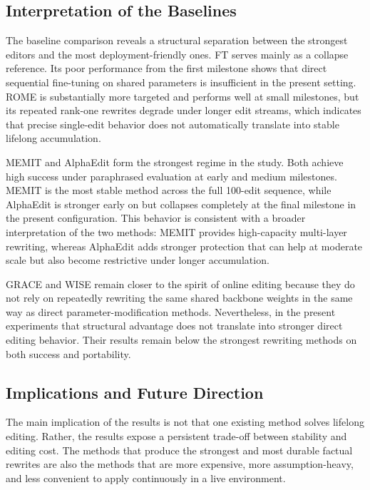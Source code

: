 \subsection{Interpretation of the Baselines}

The baseline comparison reveals a structural separation between the strongest editors and the most deployment-friendly ones. FT serves mainly as a collapse reference. Its poor performance from the first milestone shows that direct sequential fine-tuning on shared parameters is insufficient in the present setting. ROME is substantially more targeted and performs well at small milestones, but its repeated rank-one rewrites degrade under longer edit streams, which indicates that precise single-edit behavior does not automatically translate into stable lifelong accumulation.

MEMIT and AlphaEdit form the strongest regime in the study. Both achieve high success under paraphrased evaluation at early and medium milestones. MEMIT is the most stable method across the full 100-edit sequence, while AlphaEdit is stronger early on but collapses completely at the final milestone in the present configuration. This behavior is consistent with a broader interpretation of the two methods: MEMIT provides high-capacity multi-layer rewriting, whereas AlphaEdit adds stronger protection that can help at moderate scale but also become restrictive under longer accumulation.

GRACE and WISE remain closer to the spirit of online editing because they do not rely on repeatedly rewriting the same shared backbone weights in the same way as direct parameter-modification methods. Nevertheless, in the present experiments that structural advantage does not translate into stronger direct editing behavior. Their results remain below the strongest rewriting methods on both success and portability.

\subsection{Implications and Future Direction}

The main implication of the results is not that one existing method solves lifelong editing. Rather, the results expose a persistent trade-off between stability and editing cost. The methods that produce the strongest and most durable factual rewrites are also the methods that are more expensive, more assumption-heavy, and less convenient to apply continuously in a live environment.

